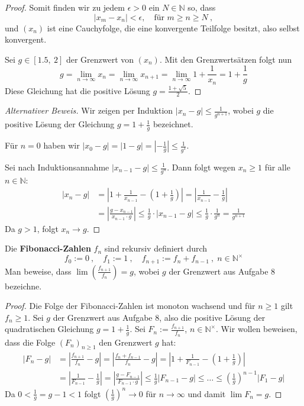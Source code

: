 \begin{proof}
Somit finden wir zu jedem $\epsilon > 0$ ein $N \in \mathbb N$ so, dass
\[
|x_m - x_n| < \epsilon, \quad \text{für } m \geq n \geq N \ ,
\]
und $(x_n)$ ist eine Cauchyfolge, die eine konvergente Teilfolge besitzt, also selbst
konvergent.

Sei $g \in \left[ 1.5, \ 2 \right]$ der Grenzwert von $(x_n)$.
Mit den Grenzwertsätzen folgt nun
\[
g = \lim_{n \to \infty} x_n = \lim_{n \to \infty} x_{n+1}
	= \lim_{n \to \infty} 1 + \frac{1}{x_n} = 1 + \frac 1 g
\]
Diese Gleichung hat die positive Lösung $g = \frac{{1} + \sqrt{5}}{2}$.
\end{proof}

\begin{proof}[Alternativer Beweis]
Wir zeigen per Induktion $|x_n - g| \leq \frac{1}{g^{n+1}}$, wobei $g$ die positive Lösung der Gleichung
$g = 1 + \frac 1 g $ bezeichnet.

Für $n = 0$ haben wir $|x_0 - g| = | 1 - g | = \left| - \frac 1 g \right| \leq \frac{1}{g^1}$.

Sei nach Induktionsannahme $|x_{n-1} - g | \leq \frac{1}{g^n}$. Dann folgt wegen
$x_n \geq 1$ für alle $n \in \mathbb N$:
\begin{align*}
| x_n - g | 
	&= \left| 1 + \frac{1}{x_{n-1}} - \left( 1 + \frac 1 g \right) \right|
	= \left| \frac{1}{x_{n-1}} - \frac 1 g \right| \\
	&= \left| \frac{g - x_{n-1}}{x_{n-1} \cdot g} \right|
	\leq \frac 1 g \cdot | x_{n-1} - g|
	\leq \frac 1 g \cdot \frac{1}{g^n} = \frac{1}{g^{n+1}}
\end{align*}
Da $g > 1$, folgt $x_n \to g$.
\end{proof}

\begin{aufgabe}
Die \textbf{Fibonacci-Zahlen} $f_n$ sind rekursiv definiert durch
\[
f_0 := 0 \ , \quad f_1 := 1 \ , \quad f_{n+1} := f_n + f_{n-1} \ , \; n \in \mathbb N^\times
\]
Man beweise, dass $\lim \left( \frac{ f_{n+1}}{f_n} \right) = g$, wobei $g$ der
Grenzwert aus Aufgabe 8 bezeichne.
\end{aufgabe}
\begin{proof}
Die Folge der Fibonacci-Zahlen ist monoton wachsend und für $n \geq 1$ gilt $f_n \geq 1$.
Sei $g$ der Grenzwert aus Aufgabe 8, also die positive Lösung der quadratischen Gleichung
$g = 1 + \frac 1 g$.
Sei $F_n := \frac{f_{n+1}}{f_n}$, $n \in \mathbb N^\times$. Wir wollen beweisen, dass
die Folge $(F_n)_{n \geq 1}$ den Grenzwert $g$ hat:
\begin{align*}
| F_n - g |
	&= \left| \frac{ f_{n+1}}{f_n} - g \right|
	= \left| \frac{f_n + f_{n-1}}{f_n} - g \right|
	= \left| 1 + \frac{1}{F_{n-1}} - \left( 1 + \frac 1 g \right) \right| \\
	&= \left| \frac{1}{F_{n-1}} - \frac 1 g \right|
	= \left| \frac{g - F_{n-1}}{ F_{n-1} \cdot g } \right|
	\leq \frac 1 g | F_{n-1} - g | 
	\leq \ldots \leq \left( \frac 1 g \right)^{n-1} |F_1 - g|
\end{align*}
Da $0 < \frac 1 g = g -1 < 1$ folgt
$\left( \frac 1 g \right)^n \to 0$ für $n \to \infty$ und damit
$\lim F_n = g$.
\end{proof}

